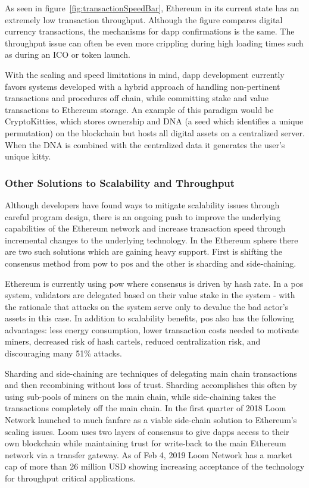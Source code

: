 As seen in figure~\ref{fig:transactionSpeedBar}, Ethereum in its current state has an extremely
low transaction throughput. Although the figure compares digital currency transactions, the
mechanisms for \ac{dapp} confirmations is the same. The throughput issue can often be
even more crippling during high loading times such as during an ICO or token launch.

With the scaling and speed limitations in mind, \ac{dapp} development currently favors systems
developed with a hybrid approach of handling non-pertinent transactions and procedures off chain, while
committing stake and value transactions to Ethereum storage. An example of this paradigm
would be CryptoKitties, which stores ownership and DNA (a seed which identifies a unique permutation) on
the blockchain but hosts all digital assets on a centralized server. When the DNA is combined
with the centralized data it generates the user's unique kitty.\cite{CryptoKitties}

\subsubsection{Other Solutions to Scalability and Throughput}

Although developers have found ways to mitigate scalability issues through careful program
design, there is an ongoing push to improve the underlying capabilities of the Ethereum network
and increase transaction speed through incremental changes to the underlying technology. In the
Ethereum sphere there are two such solutions which are gaining heavy support. First is shifting
the consensus method from \acf{pow} to \acf{pos} and the other is sharding
and side-chaining.

Ethereum is currently using \ac{pow} where consensus is driven by hash rate. In a \ac{pos} system,
validators are delegated based on their value stake in the system - with the rationale
that attacks on the system serve only to devalue the bad actor's assets in this case.
In addition to scalability benefits, \ac{pos} also has the following advantages: less energy
consumption, lower transaction costs needed to motivate miners, decreased risk of hash
cartels, reduced centralization risk, and discouraging many 51\% attacks.\cite{ProofOfStake}

Sharding and side-chaining are techniques of delegating main chain transactions and then
recombining without loss of trust. Sharding accomplishes this often by using sub-pools of miners
on the main chain, while side-chaining takes the transactions completely off the main chain.
In the first quarter of 2018 Loom Network launched to much fanfare as a viable side-chain
solution to Ethereum's scaling issues. Loom uses two layers of consensus to give \ac{dapp}s
access to their own blockchain while maintaining trust for write-back to the main Ethereum network
via a transfer gateway. As of Feb 4, 2019 Loom Network has a market cap of more than 26 million USD
showing increasing acceptance of the technology for throughput critical applications.\cite{CoinMarketCap} 

